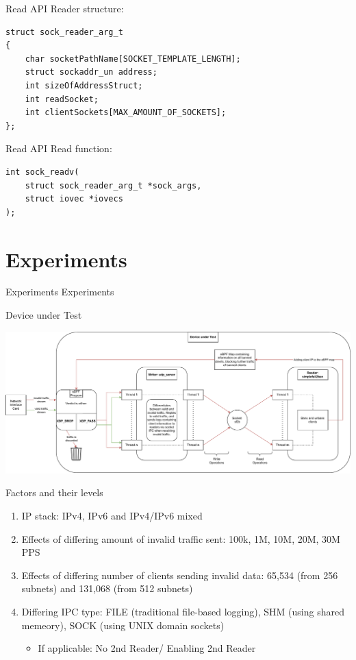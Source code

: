 \documentclass[11pt,english,table,dvipsnames]{beamer}
\begin{document}
\begin{frame}[fragile]{Read API}
    \vfill
    Reader structure\@:
    \vfill
    \begin{lstlisting}[breaklines]
struct sock_reader_arg_t
{
    char socketPathName[SOCKET_TEMPLATE_LENGTH];
    struct sockaddr_un address;
    int sizeOfAddressStruct;
    int readSocket;
    int clientSockets[MAX_AMOUNT_OF_SOCKETS];
};
    \end{lstlisting}
\end{frame}

\begin{frame}[fragile]{Read API}
    \vfill
    Read function\@:
    \vfill
    \begin{lstlisting}
int sock_readv(
    struct sock_reader_arg_t *sock_args,
    struct iovec *iovecs
);
    \end{lstlisting}
\end{frame}

\section{Experiments}
\begin{frame}{Experiments}
    Experiments
\end{frame}

\begin{frame}{Device under Test}
    \begin{center}
        \includegraphics[width=1.\linewidth]{images/MeasurementArchitecture.pdf}
    \end{center}
\end{frame}

\begin{frame}{Factors and their levels}
    \begin{enumerate}
        \item IP stack: IPv4, IPv6 and IPv4/IPv6 mixed
        \item Effects of differing amount of invalid traffic sent: 100k, 1M, 10M, 20M, 30M PPS
        \item Effects of differing number of clients sending invalid data: 65,534 (from 256 subnets) and 131,068 (from 512 subnets)
        \item Differing IPC type\@: FILE (traditional file-based logging), SHM (using shared memeory), SOCK (using UNIX domain sockets)
            \begin{itemize}
                \item If applicable\@: No 2nd Reader/ Enabling 2nd Reader
            \end{itemize}
    \end{enumerate}
\end{frame}
\end{document}
